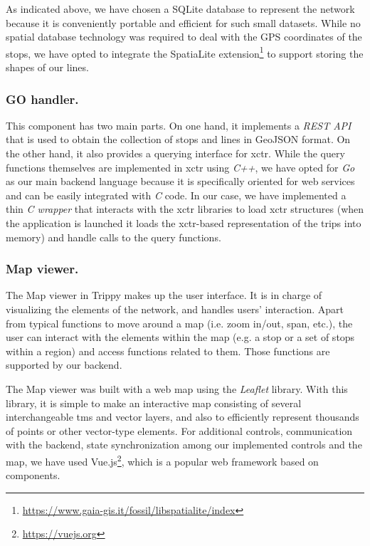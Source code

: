     As indicated above, we have chosen  a SQLite database to represent the network because it is conveniently portable and efficient for such small datasets. While no spatial database technology was required to deal with the GPS coordinates of the  stops, we have opted to integrate the  SpatiaLite extension\footnote{\url{https://www.gaia-gis.it/fossil/libspatialite/index}} to support storing the shapes of our lines.
    
    \subsubsection{\bf GO handler.}
    This component has two main parts. On one hand, it implements a {\em REST API} that is used to obtain the collection of stops and lines in GeoJSON format. On the other hand, it also provides a querying interface for \gls{xctr}. While the query functions themselves are implemented in \gls{xctr} using {\em C++}, we have opted for {\em Go} as our main backend language because it is specifically oriented for web services and can be easily integrated with {\em C} code. In our case, we have implemented a thin {\em C wrapper} that interacts with the \gls{xctr} libraries to load \gls{xctr} structures (when the application is launched it loads the \gls{xctr}-based representation of the trips into memory) and handle calls to the query functions.
    
    \subsubsection{\bf Map viewer.}
    The Map viewer in Trippy makes up the user interface. It is in charge of visualizing the elements of the network, and handles users’ interaction. Apart from typical functions to move around a map (i.e. zoom in/out, span, etc.), the user can interact with the elements within the map (e.g. a stop or a set of stops within a region) and access functions related to them. Those functions are supported by our backend.
    
    The Map viewer was built with a web map using the {\em Leaflet} library. With this library, it is simple to make an interactive map consisting of several interchangeable \gls{tms} and vector layers, and also to efficiently represent thousands of points or other vector-type elements.
    For additional controls, communication with the backend, state synchronization among our implemented controls and the map, we have used Vue.js\footnote{\url{https://vuejs.org}}, which is a popular web framework based on components.

